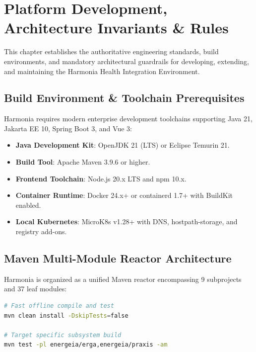 
\chapter{Platform Development, Architecture Invariants \& Rules}
\label{chap:development_invariants}

This chapter establishes the authoritative engineering standards, build environments, and mandatory architectural guardrails for developing, extending, and maintaining the Harmonia Health Integration Environment.

\section{Build Environment \& Toolchain Prerequisites}

Harmonia requires modern enterprise development toolchains supporting Java 21, Jakarta EE 10, Spring Boot 3, and Vue 3:
\begin{itemize}
    \item \textbf{Java Development Kit}: OpenJDK 21 (LTS) or Eclipse Temurin 21.
    \item \textbf{Build Tool}: Apache Maven 3.9.6 or higher.
    \item \textbf{Frontend Toolchain}: Node.js 20.x LTS and npm 10.x.
    \item \textbf{Container Runtime}: Docker 24.x+ or containerd 1.7+ with BuildKit enabled.
    \item \textbf{Local Kubernetes}: MicroK8s v1.28+ with DNS, hostpath-storage, and registry add-ons.
\end{itemize}

\section{Maven Multi-Module Reactor Architecture}

Harmonia is organized as a unified Maven reactor encompassing 9 subprojects and 37 leaf modules:
\begin{lstlisting}[language=bash, caption={Building Entire Platform Stack}]
# Fast offline compile and test
mvn clean install -DskipTests=false

# Target specific subsystem build
mvn test -pl energeia/erga,energeia/praxis -am
\end{lstlisting}

